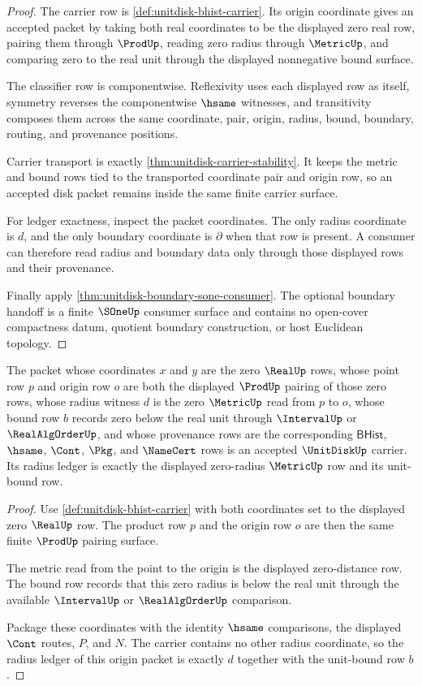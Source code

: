 \begin{proof}
The carrier row is \autoref{def:unitdisk-bhist-carrier}. Its origin coordinate gives an accepted packet by taking both real coordinates to be the displayed zero real row, pairing them through $\ProdUp$, reading zero radius through $\MetricUp$, and comparing zero to the real unit through the displayed nonnegative bound surface.

The classifier row is componentwise. Reflexivity uses each displayed row as itself, symmetry reverses the componentwise $\hsame$ witnesses, and transitivity composes them across the same coordinate, pair, origin, radius, bound, boundary, routing, and provenance positions.

Carrier transport is exactly \autoref{thm:unitdisk-carrier-stability}. It keeps the metric and bound rows tied to the transported coordinate pair and origin row, so an accepted disk packet remains inside the same finite carrier surface.

For ledger exactness, inspect the packet coordinates. The only radius coordinate is $d$, and the only boundary coordinate is $\partial$ when that row is present. A consumer can therefore read radius and boundary data only through those displayed rows and their provenance.

Finally apply \autoref{thm:unitdisk-boundary-sone-consumer}. The optional boundary handoff is a finite $\SOneUp$ consumer surface and contains no open-cover compactness datum, quotient boundary construction, or host Euclidean topology.
\end{proof}

\begin{theorem}
\label{thm:unitdisk-origin-radius-ledger}
The packet whose coordinates $x$ and $y$ are the zero $\RealUp$ rows, whose point row $p$ and origin row $o$ are both the displayed $\ProdUp$ pairing of those zero rows, whose radius witness $d$ is the zero $\MetricUp$ read from $p$ to $o$, whose bound row $b$ records zero below the real unit through $\IntervalUp$ or $\RealAlgOrderUp$, and whose provenance rows are the corresponding $\mathsf{BHist}$, $\hsame$, $\Cont$, $\Pkg$, and $\NameCert$ rows is an accepted $\UnitDiskUp$ carrier. Its radius ledger is exactly the displayed zero-radius $\MetricUp$ row and its unit-bound row.
\end{theorem}
\begin{proof}
Use \autoref{def:unitdisk-bhist-carrier} with both coordinates set to the displayed zero $\RealUp$ row. The product row $p$ and the origin row $o$ are then the same finite $\ProdUp$ pairing surface.

The metric read from the point to the origin is the displayed zero-distance row. The bound row records that this zero radius is below the real unit through the available $\IntervalUp$ or $\RealAlgOrderUp$ comparison.

Package these coordinates with the identity $\hsame$ comparisons, the displayed $\Cont$ routes, $P$, and $N$. The carrier contains no other radius coordinate, so the radius ledger of this origin packet is exactly $d$ together with the unit-bound row $b$.
\end{proof}

